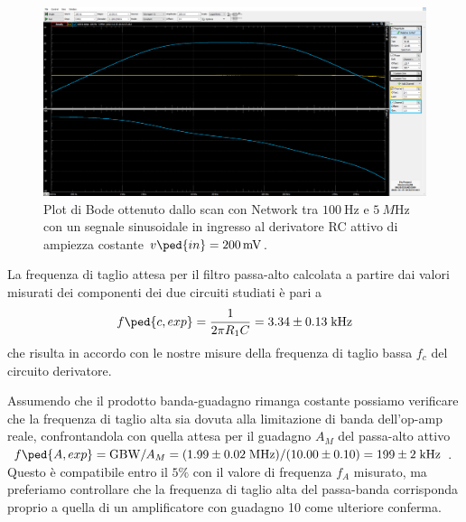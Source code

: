 \documentclass[10pt,a4paper]{article}
\begin{document}
\begin{figure}[htbp]
\centering
\includegraphics[scale=0.335]{hpfbode}
\caption{Plot di Bode ottenuto dallo scan con Network tra $\SI{100}{\Hz}$ e
$\SI{5}{M\Hz}$ con un segnale sinusoidale in ingresso al derivatore RC attivo
di ampiezza costante $v\ped{in} = \SI{200}{m\V}$.
\label{fig: derbode}}
\end{figure}

La frequenza di taglio attesa per il filtro passa-alto calcolata a partire
dai valori misurati dei componenti dei due circuiti studiati è pari a
\begin{equation}\label{eq: hpfcut}
f\ped{c, exp} = \frac{1}{2\pi R_1 C} = 3.34 \pm 0.13 \; \si{k\Hz}
\end{equation}
che risulta in accordo con le nostre misure della frequenza di taglio
bassa $f_c$ del circuito derivatore.

Assumendo che il prodotto banda-guadagno rimanga costante possiamo verificare
che la frequenza di taglio alta sia dovuta alla limitazione di banda
dell'op-amp reale, confrontandola con quella attesa per il guadagno $A_M$ del
passa-alto attivo
$f\ped{A, exp} = \mathrm{GBW}/A_M
= (1.99 \pm 0.02 \; \si{M\Hz})/(10.00 \pm 0.10) = 199 \pm 2 \; \si{k\Hz}$.
Questo è compatibile entro il $5\%$ con il valore di frequenza $f_A$ misurato,
ma preferiamo controllare che la frequenza di taglio alta del passa-banda
corrisponda proprio a quella di un amplificatore con guadagno 10 come ulteriore
conferma.
\end{document}
